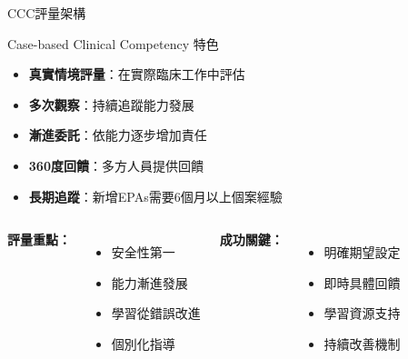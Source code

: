 \documentclass[aspectratio=169]{beamer}
\begin{document}
\begin{frame}{CCC評量架構}
\begin{block}{Case-based Clinical Competency 特色}
\begin{itemize}
\item \textbf{真實情境評量}：在實際臨床工作中評估
\item \textbf{多次觀察}：持續追蹤能力發展
\item \textbf{漸進委託}：依能力逐步增加責任
\item \textbf{360度回饋}：多方人員提供回饋
\item \textcolor{emergency_red}{\textbf{長期追蹤}：新增EPAs需要6個月以上個案經驗}
\end{itemize}
\end{block}

\vspace{0.5cm}

\begin{columns}[c]
\textbf{評量重點：}
\begin{itemize}
\item 安全性第一
\item 能力漸進發展
\item 學習從錯誤改進
\item 個別化指導
\end{itemize}

\textbf{成功關鍵：}
\begin{itemize}
\item 明確期望設定
\item 即時具體回饋
\item 學習資源支持
\item 持續改善機制
\end{itemize}
\end{columns}
\end{frame}
\end{document}
